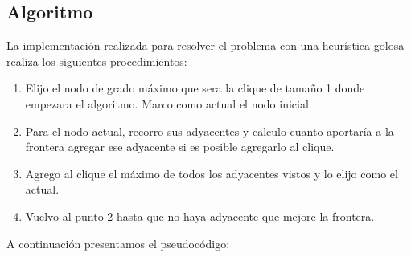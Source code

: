 \documentclass[a4paper, 10pt, twoside]{article}
\begin{document}
\subsection{Algoritmo}
La implementación realizada para resolver el problema con una heurística golosa realiza los siguientes procedimientos:
\begin{enumerate}
\item Elijo el nodo de grado máximo que sera la clique de tamaño 1 donde empezara el algoritmo. Marco como actual el nodo inicial.
\item Para el nodo actual, recorro sus adyacentes y calculo cuanto aportaría a la frontera agregar ese adyacente si es posible agregarlo al clique.
\item Agrego al clique el máximo de todos los adyacentes vistos y lo elijo como el actual.
\item Vuelvo al punto 2 hasta que no haya adyacente que mejore la frontera.
\end{enumerate}

A continuación presentamos el pseudocódigo:
\end{document}
